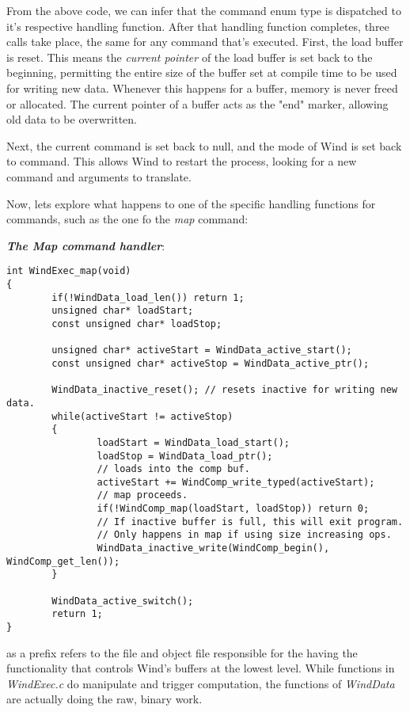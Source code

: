 \par From the above code, we can infer that the command enum type is dispatched to it's respective handling function. After that handling function completes, three calls take place, the same for any command that's executed. First, the load buffer is reset. This means the \emph{current pointer} of the load buffer is set back to the beginning, permitting the entire size of the buffer set at compile time to be used for writing new data. Whenever this happens for a buffer, memory is never freed or allocated. The current pointer of a buffer acts as the "end" marker, allowing old data to be overwritten.
\par Next, the current command is set back to null, and the mode of Wind is set back to command. This allows Wind to restart the process, looking for a new command and arguments to translate.

\par Now, lets explore what happens to one of the specific handling functions for commands, such as the one fo the \emph{map} command:

\textbf{\emph{The Map command handler}}:

\begin{lstlisting}[style=numc]
int WindExec_map(void)
{
        if(!WindData_load_len()) return 1;
        unsigned char* loadStart;
        const unsigned char* loadStop;

        unsigned char* activeStart = WindData_active_start();
        const unsigned char* activeStop = WindData_active_ptr();

        WindData_inactive_reset(); // resets inactive for writing new data.
        while(activeStart != activeStop)
        {
                loadStart = WindData_load_start();
                loadStop = WindData_load_ptr();
                // loads into the comp buf.
                activeStart += WindComp_write_typed(activeStart);
                // map proceeds.
                if(!WindComp_map(loadStart, loadStop)) return 0;
                // If inactive buffer is full, this will exit program.
                // Only happens in map if using size increasing ops.
                WindData_inactive_write(WindComp_begin(), WindComp_get_len());
        }

        WindData_active_switch();
        return 1;
}
\end{lstlisting}

\par {} as a prefix refers to the file and object file responsible for the having the functionality that controls Wind's buffers at the lowest level. While functions in \emph{WindExec.c} do manipulate and trigger computation, the functions of \emph{WindData} are actually doing the raw, binary work.


